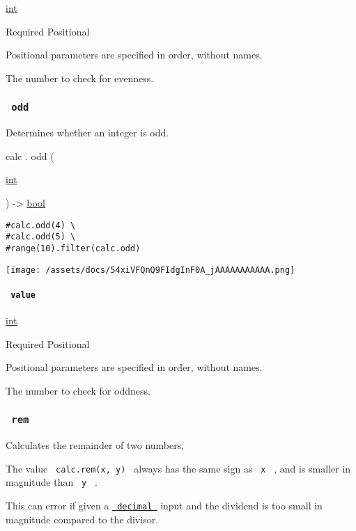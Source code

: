 \href{/docs/reference/foundations/int/}{int}

{Required} {{ Positional }}

\label{functions-even-value-positional-tooltip}
Positional parameters are specified in order, without names.

The number to check for evenness.

\subsubsection{\texorpdfstring{\texttt{\ odd\ }}{ odd }}\label{functions-odd}

Determines whether an integer is odd.

calc { . } { odd } (

{ \href{/docs/reference/foundations/int/}{int} }

) -\textgreater{} \href{/docs/reference/foundations/bool/}{bool}

\begin{verbatim}
#calc.odd(4) \
#calc.odd(5) \
#range(10).filter(calc.odd)
\end{verbatim}

\texttt{[image: /assets/docs/54xiVFQnQ9FIdgInF0A\_jAAAAAAAAAAA.png]}

\paragraph{\texorpdfstring{\texttt{\ value\ }}{ value }}\label{functions-odd-value}

\href{/docs/reference/foundations/int/}{int}

{Required} {{ Positional }}

\label{functions-odd-value-positional-tooltip}
Positional parameters are specified in order, without names.

The number to check for oddness.

\subsubsection{\texorpdfstring{\texttt{\ rem\ }}{ rem }}\label{functions-rem}

Calculates the remainder of two numbers.

The value \texttt{\ calc.rem(x,\ y)\ } always has the same sign as
\texttt{\ x\ } , and is smaller in magnitude than \texttt{\ y\ } .

This can error if given a
\href{/docs/reference/foundations/decimal/}{\texttt{\ decimal\ }} input
and the dividend is too small in magnitude compared to the divisor.

